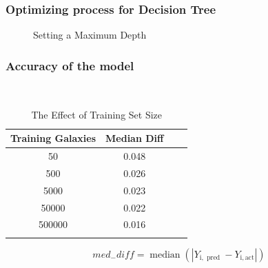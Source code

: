 \documentclass{beamer}
\begin{document}
\begin{frame}
	\frametitle{Optimizing process for Decision Tree}
    \begin{figure}
        \caption*{Setting a Maximum Depth}
    \end{figure}
    \end{frame}
\begin{frame}
	\frametitle{Accuracy of the model}
    \begin{table}[ht]\
        \caption*{The Effect of Training Set Size} %
        \centering %
        \begin{tabular}{c c c c} %
        \hline\hline %
        Training Galaxies & Median Diff \\ [0.5ex] %
        \hline %
        50 & 0.048  \\ %
        500 & 0.026  \\
        5000 & 0.023  \\
        50000 & 0.022  \\  %
        500000 & 0.016 \\[1ex]
        \hline %
        \\
        \end{tabular}
        \label{table:nonlin} %
        \end{table}
        \begin{equation}
            m e d_{-} d i f f=\operatorname{median}\left(\left|Y_{\mathrm{i}, \text { pred }}-Y_{\mathrm{i}, \mathrm{act}}\right|\right)
            \end{equation}
    \end{frame}
\end{document}
